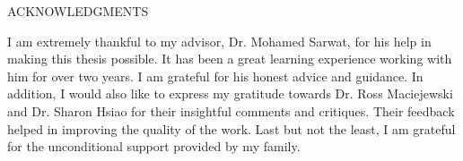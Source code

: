 \begin{center}
\doublespace
ACKNOWLEDGMENTS
\end{center}

{I am extremely thankful to my advisor, Dr. Mohamed Sarwat, for his help in making this thesis possible. It has been a great learning experience working with him for over two years. I am grateful for his honest advice and guidance. In addition, I would also like to express my gratitude towards Dr. Ross Maciejewski and Dr. Sharon Hsiao for their insightful comments and critiques. Their feedback helped in improving the quality of the work. Last but not the least, I am grateful for the unconditional support provided by my family.}
